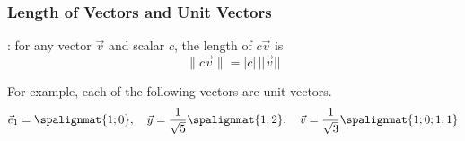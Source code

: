 \begin{frame}\frametitle{Length of Vectors and Unit Vectors}

    : for any vector $ \vec v$ and scalar $c$, the length of $ c \vec v$ is %
    \begin{equation*}
        \lVert c\vec v\rVert = |c| \, ||\vec v||
    \end{equation*}
    
    \begin{center}\end{center}
    

    \vspace{6pt}
    
    \pause

    For example, each of the following vectors are unit vectors.  
    \begin{align*}
        \vec e_1 = \spalignmat{1;0} , \quad
        \vec y = \frac{1}{\sqrt 5}\spalignmat{1;2} , \quad 
        \vec v = \frac{1}{\sqrt 3}\spalignmat{1;0;1;1}
    \end{align*}

\end{frame}
 
 
 
 
 
 
 
